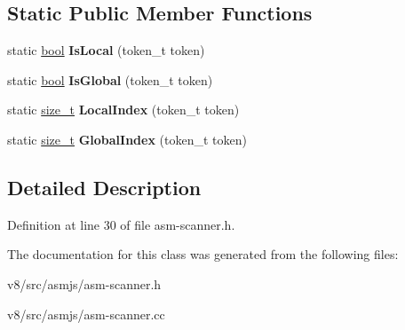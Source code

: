\subsection*{Static Public Member Functions}
\begin{DoxyCompactItemize}
\item 
\mbox{\label{classv8_1_1internal_1_1AsmJsScanner_a3b3ab825d8d4e1ae806b6d60f5628b35}} 
static \mbox{\hyperlink{classbool}{bool}} {\bfseries Is\+Local} (token\+\_\+t token)
\item 
\mbox{\label{classv8_1_1internal_1_1AsmJsScanner_ac3f088349c4d21ede85fb770612d63a8}} 
static \mbox{\hyperlink{classbool}{bool}} {\bfseries Is\+Global} (token\+\_\+t token)
\item 
\mbox{\label{classv8_1_1internal_1_1AsmJsScanner_a1fce685fc9fe291ec1a152b17aa411a7}} 
static \mbox{\hyperlink{classsize__t}{size\+\_\+t}} {\bfseries Local\+Index} (token\+\_\+t token)
\item 
\mbox{\label{classv8_1_1internal_1_1AsmJsScanner_a1af4b43f1783dc477ad8b1fe39596676}} 
static \mbox{\hyperlink{classsize__t}{size\+\_\+t}} {\bfseries Global\+Index} (token\+\_\+t token)
\end{DoxyCompactItemize}


\subsection{Detailed Description}


Definition at line 30 of file asm-\/scanner.\+h.



The documentation for this class was generated from the following files\+:\begin{DoxyCompactItemize}
\item 
v8/src/asmjs/asm-\/scanner.\+h\item 
v8/src/asmjs/asm-\/scanner.\+cc\end{DoxyCompactItemize}
